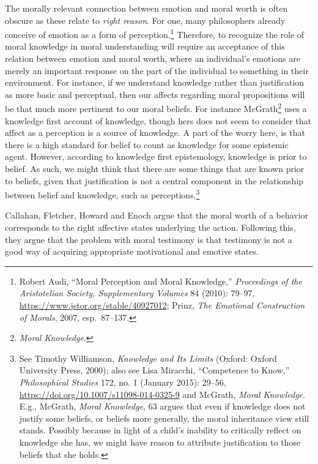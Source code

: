\documentclass[phdthesis,12pt,final]{wuthesis}
\theoremstyle{definition}
\theoremstyle{definition}
\theoremstyle{definition}
\theoremstyle{definition}
\theoremstyle{remark}
\begin{document}
The morally relevant connection between emotion and moral worth is often obscure as these relate to \emph{right reason}. For one, many philosophers already conceive of emotion as a form of perception.\footnote{Robert Audi, {``Moral {Perception} and {Moral Knowledge},''} \emph{Proceedings of the Aristotelian Society, Supplementary Volumes} 84 (2010): 79--97, \url{https://www.jstor.org/stable/40927012}; Prinz, \emph{The {Emotional Construction} of {Morals}}, 2007, esp.~87--137.} Therefore, to recognize the role of moral knowledge in moral understanding will require an acceptance of this relation between emotion and moral worth, where an individual's emotions are merely an important response on the part of the individual to something in their environment. For instance, if we understand knowledge rather than justification as more basic and perceptual, then our affects regarding moral propositions will be that much more pertinent to our moral beliefs. For instance McGrath\footnote{\emph{Moral {Knowledge}}.} uses a knowledge first account of knowledge, though hers does not seem to consider that affect as a perception is a source of knowledge. A part of the worry here, is that there is a high standard for belief to count as knowledge for some epistemic agent. However, according to knowledge first epistemology, knowledge is prior to belief. As such, we might think that there are some things that are known prior to beliefs, given that justification is not a central component in the relationship between belief and knowledge, such as perceptions.\footnote{See Timothy Williamson, \emph{Knowledge and {Its Limits}} (Oxford: Oxford University Press, 2000); also see Lisa Miracchi, {``Competence to Know,''} \emph{Philosophical Studies} 172, no. 1 (January 2015): 29--56, \url{https://doi.org/10.1007/s11098-014-0325-9} and McGrath, \emph{Moral {Knowledge}}. E.g., McGrath, \emph{Moral {Knowledge}}, 63 argues that even if knowledge does not justify some beliefs, or beliefs more generally, the moral inheritance view still stands. Possibly because in light of a child's inability to critically reflect on knowledge she has, we might have reason to attribute justification to those beliefs that she holds.}

Callahan, Fletcher, Howard and Enoch argue that the moral worth of a behavior corresponds to the right affective states underlying the action. Following this, they argue that the problem with moral testimony is that testimony is not a good way of acquiring appropriate motivational and emotive states.
\end{document}
